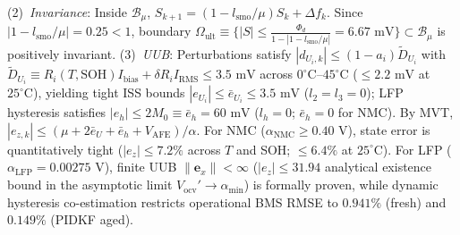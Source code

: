 \documentclass[balance,nocopyright,upint,varvw,hyphenate,barcolor=NavyBlue,nolists]{asmejour}
\begin{document}
(2)~\emph{Invariance}: Inside $\mathcal{B}_\mu$, $S_{k+1} = (1 - l_{\text{smo}}/\mu)S_k + \Delta f_k$. Since $|1 - l_{\text{smo}}/\mu| = 0.25 < 1$, boundary $\Omega_{\text{ult}} \equiv \{|S| \le \frac{\Phi_d}{1 - |1 - l_{\text{smo}}/\mu|} = 6.67\text{ mV}\} \subset \mathcal{B}_\mu$ is positively invariant. 
(3)~\emph{UUB}: Perturbations satisfy $|d_{U_i,k}| \le (1 - a_i)\tilde{D}_{U_i}$ with $\tilde{D}_{U_i} \equiv R_i(T,\text{SOH}) I_{\text{bias}} + \delta R_i I_{\text{RMS}} \le 3.5\text{ mV}$ across $0^\circ\text{C}\text{--}45^\circ\text{C}$ ($\le 2.2\text{ mV}$ at $25^\circ\text{C}$), yielding tight ISS bounds $|e_{U_i}| \le \bar{e}_{U_i} \le 3.5\text{ mV}$ ($l_2=l_3=0$); LFP hysteresis satisfies $|e_h| \le 2 M_0 \equiv \bar{e}_h = 60\text{ mV}$ ($l_h=0$; $\bar{e}_h = 0$ for NMC). By MVT, $|e_{z,k}| \le (\mu + 2\bar{e}_{U} + \bar{e}_h + V_{\text{AFE}})/\alpha$. For NMC ($\alpha_{\text{NMC}} \ge 0.40\text{ V}$), state error is quantitatively tight ($|e_z| \le 7.2\%$ across $T$ and SOH; $\le 6.4\%$ at $25^\circ\text{C}$). For LFP ($\alpha_{\text{LFP}} = 0.00275\text{ V}$), finite UUB $\|\mathbf{e}_x\| < \infty$ ($|e_z| \le 31.94$ analytical existence bound in the asymptotic limit $V_{\text{ocv}}' \to \alpha_{\min}$) is formally proven, while dynamic hysteresis co-estimation restricts operational BMS RMSE to $0.941\%$ (fresh) and $0.149\%$ (PIDKF aged). 
\end{document}
